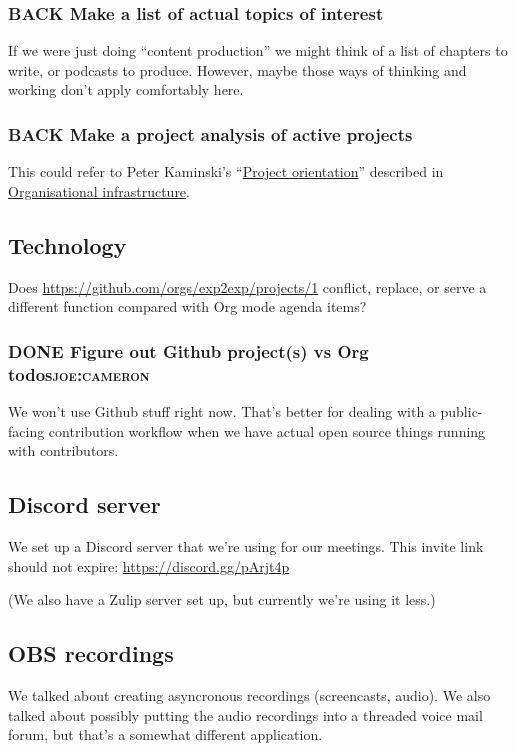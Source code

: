 \documentclass[11pt]{article}
\begin{document}
\subsubsection{{\bfseries\sffamily BACK} Make a list of actual topics of interest}
\label{sec:org6c549be}
If we were just doing “content production” we might think of a list of
chapters to write, or podcasts to produce. However, maybe those ways
of thinking and working don’t apply comfortably here.

\subsubsection{{\bfseries\sffamily BACK} Make a project analysis of active projects}
\label{sec:org2710885}
This could refer to Peter Kaminski’s ``\hyperref[sec:orgca056dc]{Project orientation}'' described in \hyperref[sec:orge4802fc]{Organisational infrastructure}.

\subsection{Technology}
\label{sec:orgc37247b}

Does \url{https://github.com/orgs/exp2exp/projects/1} conflict, replace, or
serve a different function compared with Org mode agenda items?

\subsubsection{{\bfseries\sffamily DONE} Figure out Github project(s) vs Org todos\hfill{}\textsc{joe:cameron}}
\label{sec:org99c8fa0}

We won’t use Github stuff right now.  That’s better for dealing with a
public-facing contribution workflow when we have actual open source
things running with contributors.

\subsection{Discord server}
\label{sec:orge100869}
We set up a Discord server that we’re using for our meetings.  This
invite link should not expire: \url{https://discord.gg/pArjt4p}

(We also have a Zulip server set up, but currently we’re using it
less.)
\subsection{OBS recordings}
\label{sec:org1b47ff5}
We talked about creating asyncronous recordings (screencasts,
audio). We also talked about possibly putting the audio recordings
into a threaded voice mail forum, but that's a somewhat different
application.
\end{document}
